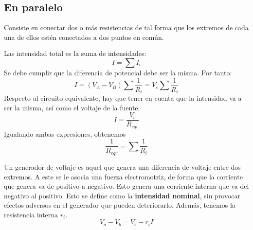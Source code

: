 \documentclass{./FisicaII.tex}
\begin{document}
\subsection{En paralelo}
Consiste en conectar dos o más resistencias de tal forma que los extremos de cada una de ellos estén conectados a dos puntos en común.
\begin{figure}
	\centering




\end{figure}
Las intensidad total es la suma de intensidades:
\[
	I = \sum I_{i}
\]
Se debe cumplir que la diferencia de potencial debe ser la misma. Por tanto:
\[
	I = (V_{A} - V_{B}) \sum \frac{1}{R_{i}} = V_{\varepsilon} \sum \frac{1}{R_{i}}
\]
Respecto al circuito equivalente, hay que tener en cuenta que la intensidad va a ser la misma, así como el voltaje de la fuente.
\[
	I = \frac{V_{\epsilon}}{R_{eqv}}
\]
Igualando ambas expresiones, obtenemos
\[
	\frac{1}{R_{eqv}} = \sum \frac{1}{R_{i}}
\]
\begin{defin}
Un generador de voltaje es aquel que genera una diferencia de voltaje entre dos extremos. A este se le asocia una fuerza electromotriz, de forma que la corriente que genera va de positivo a negativo. Esto genera una corriente interna que va del negativo al positivo. Esto se define como la \textbf{intensidad nominal}, sin provocar efectos adversos en el generador que pueden deteriorarlo. Además, tenemos la resistencia interna $r_{i}$.
\[
	V_{a}- V_{b} = V_{\varepsilon} - r_{i}I
\]
\end{defin}
\end{document}
